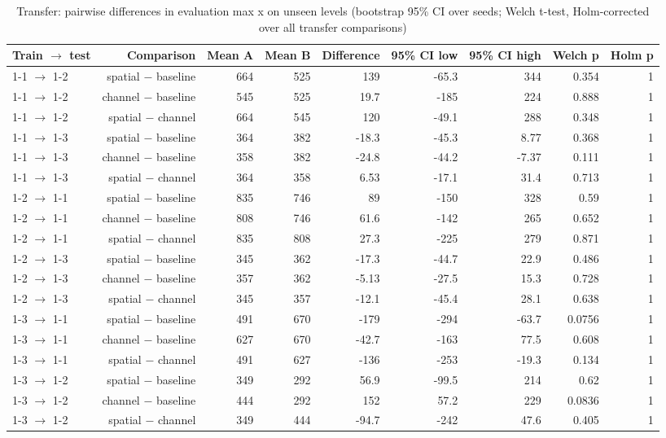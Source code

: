 \begin{table}[t]
\centering
\caption{Transfer: pairwise differences in evaluation max x on unseen levels (bootstrap 95\% CI over seeds; Welch t-test, Holm-corrected over all transfer comparisons)}
\label{tab:transfer_statistics}
\begin{tabular}{lrrrrrrrr}
\toprule
Train $\rightarrow$ test & Comparison & Mean A & Mean B & Difference & 95\% CI low & 95\% CI high & Welch p & Holm p \\
\midrule
1-1 $\rightarrow$ 1-2 & spatial $-$ baseline & 664 & 525 & 139 & -65.3 & 344 & 0.354 & 1 \\
1-1 $\rightarrow$ 1-2 & channel $-$ baseline & 545 & 525 & 19.7 & -185 & 224 & 0.888 & 1 \\
1-1 $\rightarrow$ 1-2 & spatial $-$ channel & 664 & 545 & 120 & -49.1 & 288 & 0.348 & 1 \\
1-1 $\rightarrow$ 1-3 & spatial $-$ baseline & 364 & 382 & -18.3 & -45.3 & 8.77 & 0.368 & 1 \\
1-1 $\rightarrow$ 1-3 & channel $-$ baseline & 358 & 382 & -24.8 & -44.2 & -7.37 & 0.111 & 1 \\
1-1 $\rightarrow$ 1-3 & spatial $-$ channel & 364 & 358 & 6.53 & -17.1 & 31.4 & 0.713 & 1 \\
1-2 $\rightarrow$ 1-1 & spatial $-$ baseline & 835 & 746 & 89 & -150 & 328 & 0.59 & 1 \\
1-2 $\rightarrow$ 1-1 & channel $-$ baseline & 808 & 746 & 61.6 & -142 & 265 & 0.652 & 1 \\
1-2 $\rightarrow$ 1-1 & spatial $-$ channel & 835 & 808 & 27.3 & -225 & 279 & 0.871 & 1 \\
1-2 $\rightarrow$ 1-3 & spatial $-$ baseline & 345 & 362 & -17.3 & -44.7 & 22.9 & 0.486 & 1 \\
1-2 $\rightarrow$ 1-3 & channel $-$ baseline & 357 & 362 & -5.13 & -27.5 & 15.3 & 0.728 & 1 \\
1-2 $\rightarrow$ 1-3 & spatial $-$ channel & 345 & 357 & -12.1 & -45.4 & 28.1 & 0.638 & 1 \\
1-3 $\rightarrow$ 1-1 & spatial $-$ baseline & 491 & 670 & -179 & -294 & -63.7 & 0.0756 & 1 \\
1-3 $\rightarrow$ 1-1 & channel $-$ baseline & 627 & 670 & -42.7 & -163 & 77.5 & 0.608 & 1 \\
1-3 $\rightarrow$ 1-1 & spatial $-$ channel & 491 & 627 & -136 & -253 & -19.3 & 0.134 & 1 \\
1-3 $\rightarrow$ 1-2 & spatial $-$ baseline & 349 & 292 & 56.9 & -99.5 & 214 & 0.62 & 1 \\
1-3 $\rightarrow$ 1-2 & channel $-$ baseline & 444 & 292 & 152 & 57.2 & 229 & 0.0836 & 1 \\
1-3 $\rightarrow$ 1-2 & spatial $-$ channel & 349 & 444 & -94.7 & -242 & 47.6 & 0.405 & 1 \\
\bottomrule
\end{tabular}
\end{table}
